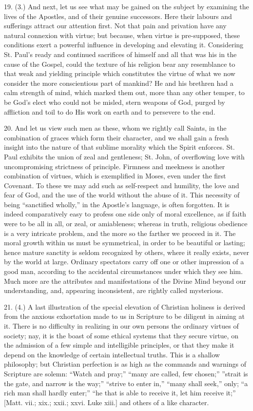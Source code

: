 19. (3.) And next, let us see what may be gained on the subject by
examining the lives of the Apostles, and of their genuine successors.
Here their labours and sufferings attract our attention first. Not
that pain and privation have any natural connexion with virtue; but
because, when virtue is pre-supposed, these conditions exert a powerful
influence in developing and elevating it. Considering St. Paul's ready
and continued sacrifices of himself and all that was his in the cause
of the Gospel, could the texture of his religion bear any resemblance
to that weak and yielding principle which constitutes the virtue of
what we now consider the more conscientious part of mankind? He and
his brethren had a calm strength of mind, which marked them out, more
than any other temper, to be God's elect who could not be misled,
stern weapons of God, purged by affliction and toil to do His work on
earth and to persevere to the end.

20. And let us view such men as these, whom we rightly call Saints,
in the combination of graces which form their character, and we shall
gain a fresh insight into the nature of that sublime morality which
the Spirit enforces. St. Paul exhibits the union of zeal and
gentleness; St. John, of overflowing love with uncompromising
strictness of principle. Firmness and meekness is another combination
of virtues, which is exemplified in Moses, even under the first
Covenant. To these we may add such as self-respect and humility, the
love and fear of God, and the use of the world without the abuse of
it. This necessity of being ``sanctified wholly,'' in the
Apostle's language, is often forgotten. It is indeed comparatively
easy to profess one side only of moral excellence, as if faith were to
be all in all, or zeal, or amiableness; whereas in truth, religious
obedience is a very intricate problem, and the more so the farther we
proceed in it. The moral growth within us must be symmetrical, in
order to be beautiful or lasting; hence mature sanctity is seldom recognized by others, where it really exists, never by the world at
large. Ordinary spectators carry off one or other impression of a good
man, according to the accidental circumstances under which they see
him. Much more are the attributes and manifestations of the Divine
Mind beyond our understanding, and, appearing inconsistent, are
rightly called mysterious.

21. (4.) A last illustration of the special elevation of Christian
holiness is derived from the anxious exhortation made to us in
Scripture to be diligent in aiming at it. There is no difficulty in
realizing in our own persons the ordinary virtues of society; nay, it
is the boast of some ethical systems that they secure virtue, on the
admission of a few simple and intelligible principles, or that they
make it depend on the knowledge of certain intellectual truths. This
is a shallow philosophy; but Christian perfection is as high as the
commands and warnings of Scripture are solemn: ``Watch and
pray;'' ``many are called, few chosen;'' ''strait is
the gate, and narrow is the way;'' ``strive to enter in,''
``many shall seek,'' only; ``a rich man shall hardly
enter;'' ``he that is able to receive it, let him receive
it;'' [Matt. vii.; xix.; xxii.; xxvi. Luke xiii.] and others of a
like character.

